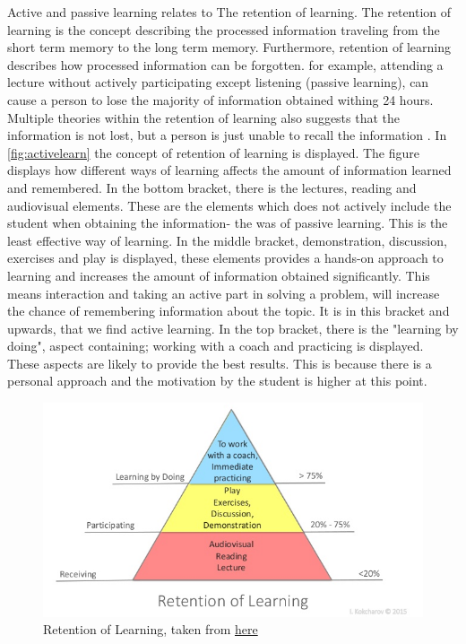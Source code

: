 Active and passive learning relates to The retention of learning.
The retention of learning is the concept describing the processed information traveling from the short term memory to the long term memory. Furthermore, retention of learning describes how processed information can be forgotten. for example, attending a lecture without actively participating except listening (passive learning), can cause a person to lose the majority of information obtained withing 24 hours. Multiple theories within the retention of learning also suggests that the information is not lost, but a person is just unable to recall the information \cite{retention}.
In \autoref{fig:activelearn} the concept of retention of learning is displayed. The figure displays how different ways of learning affects the amount of information learned and remembered. In the bottom bracket, there is the lectures, reading and audiovisual elements. These are the elements which does not actively include the student when obtaining the information- the was of passive learning. This is the least effective way of learning. In the middle bracket, demonstration, discussion, exercises and play is displayed, these elements provides a hands-on approach to learning and increases the amount of information obtained significantly. This means interaction and taking an active part in solving a problem, will increase the chance of remembering information about the topic. It is in this bracket and upwards, that we find active learning. In the top bracket, there is the "learning by doing", aspect containing; working with a coach and practicing is displayed. These aspects are likely to provide the best results. This is because there is a personal approach and the motivation by the student is higher at this point\cite{retention}. 

\begin{figure}[H]
	\centering
	\includegraphics[width=0.9\linewidth]{figure/Analysis/skillslearn}
	\caption{Retention of Learning, taken from  \href{https://www.slideshare.net/igorkokcharov/kokcharov-skillpyramid2015}{\color{blue}here}}
	\label{fig:activelearn}
\end{figure}

